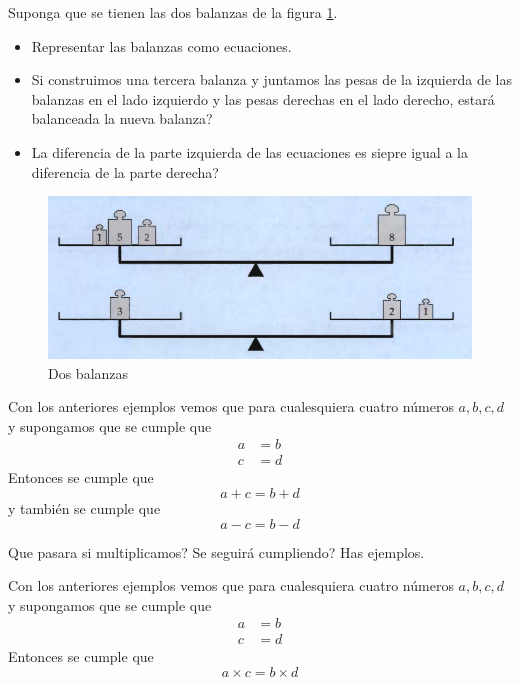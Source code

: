 \begin{ejemplo}
		Suponga que se tienen las dos balanzas de la figura \ref{fig:2balanzas}.
		\begin{itemize}
			\item Representar las balanzas como ecuaciones.
			\item Si construimos una tercera balanza y juntamos las pesas de la izquierda de las balanzas en el lado izquierdo y las pesas derechas en el lado derecho, estará balanceada la nueva balanza?
			\item La diferencia de la parte izquierda de las ecuaciones es siepre igual a la diferencia de la parte derecha?
		\end{itemize}
		\begin{figure}[H]
			\centering
			\includegraphics[width=0.8\linewidth]{Algebra/imgs/2balanzas.png}
			\caption{Dos balanzas}
			\label{fig:2balanzas}
		\end{figure}
\end{ejemplo}


\begin{tcolorbox}[colback=red!5!white,colframe=red!75!black]
	Con los anteriores ejemplos vemos que para cualesquiera cuatro números $a,b,c,d$ y supongamos que se cumple que
	\begin{align}
			a &= b\\
			c &= d
	\end{align}
	Entonces se cumple que 
	\[
	a+ c = b + d
	\]
	y también se cumple que 
	\[
	a - c = b - d
	\]	
\end{tcolorbox}

Que pasara si multiplicamos? Se seguirá cumpliendo? Has ejemplos.

\begin{tcolorbox}[colback=red!5!white,colframe=red!75!black]
	Con los anteriores ejemplos vemos que para cualesquiera cuatro números $a,b,c,d$ y supongamos que se cumple que
	\begin{align}
	a &= b\\
	c &= d
	\end{align}
	Entonces se cumple que 
	\[
	a\times c = b \times d
	\]

\end{tcolorbox}

